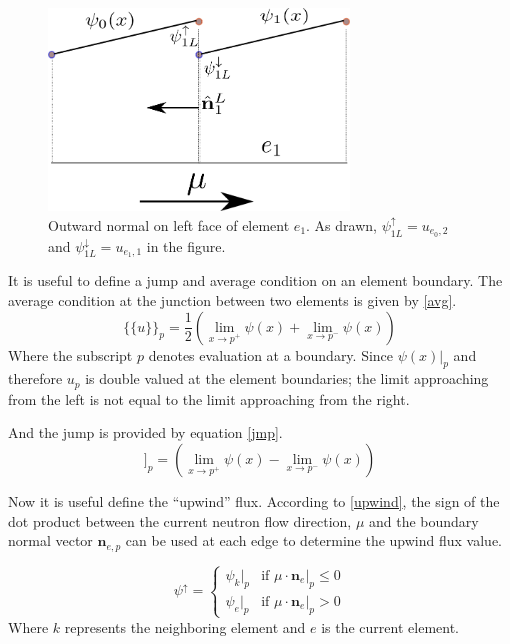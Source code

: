 \begin{figure}[!htbp]
\centering
\includegraphics[width=8cm]{images/bound_norm.png}
\caption{Outward normal on left face of element $e_1$. As drawn, $\psi_{1L}^{\uparrow}=u_{e_0, 2}$ and $\psi_{1L}^{\downarrow}=u_{e_1, 1}$ in the figure.}
\label{bound_norm}
\end{figure}

It is useful to define a jump and average condition on an element boundary.
The average condition at the junction between two elements is given by \ref{avg}.
\begin{equation}
\{\{u\}\}_p = \frac{1}{2} (\lim_{x \to p^+} \psi(x) + \lim_{x \to p^-} \psi(x))
\label{avg}
\end{equation}
Where the subscript $p$ denotes evaluation at a boundary. Since $\psi(x)|_p$ and therefore $u_p$ is double valued at the element boundaries; the limit approaching from the left is not equal to the limit approaching from the right.

And the jump is provided by equation \ref{jmp}.
\begin{equation}
[[u]]_p =  (\lim_{x \to p^+} \psi(x) - \lim_{x \to p^-} \psi(x))
\label{jmp}
\end{equation}

Now it is useful define the ``upwind'' flux.  According to \ref{upwind}, the sign of the dot product between the current neutron flow direction, $\mu$ and the boundary normal vector $\mathbf n_{e,p}$ can be used at each edge to determine the upwind flux value.

\begin{equation}
\psi^{\uparrow} = 
  \begin{cases}
      \psi_k|_p & \text{if $\mu \cdot \mathbf n_e|_p \leq 0$} \\
      \psi_e|_p & \text{if $\mu \cdot \mathbf n_e|_p > 0$} 
  \end{cases}
\label{upwind}
\end{equation}
Where $k$ represents the neighboring element and $e$ is the current element.

